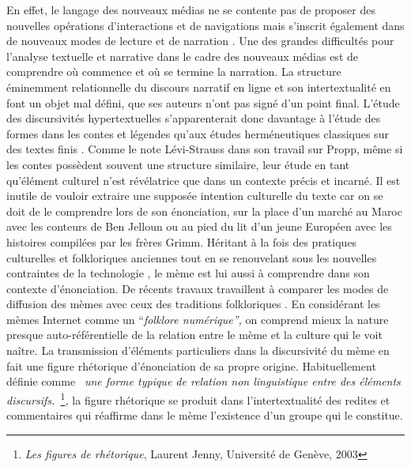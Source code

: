 En effet, le langage des nouveaux médias ne se contente pas de proposer des nouvelles opérations d{\textquoteright}interactions et de navigations mais s{\textquoteright}inscrit également dans de nouveaux modes de lecture et de narration \citep{Manovich2001}. Une des grandes difficultés pour l{\textquoteright}analyse textuelle et narrative dans le cadre des nouveaux médias est de comprendre o\`u commence et o\`u se termine la narration. La structure éminemment relationnelle du discours narratif en ligne et son intertextualité en font un objet mal défini, que ses auteurs n{\textquoteright}ont pas signé d{\textquoteright}un point final. L{\textquoteright}étude des discursivités hypertextuelles s{\textquoteright}apparenterait donc davantage à l{\textquoteright}étude des formes dans les contes et légendes qu{\textquoteright}aux études herméneutiques classiques sur des textes finis \citep{Clement1995}. Comme le note Lévi-Strauss dans son travail sur Propp, même si les contes possèdent souvent une structure similaire, leur étude en tant qu{\textquoteright}élément culturel n{\textquoteright}est révélatrice que dans un contexte précis et incarné. Il est inutile de vouloir extraire une supposée intention culturelle du texte car on se doit de le comprendre lors de son énonciation, sur la place d{\textquoteright}un marché au Maroc avec les conteurs de Ben Jelloun ou au pied du lit d{\textquoteright}un jeune Européen avec les histoires compilées par les frères Grimm. Héritant à la fois des pratiques culturelles et folkloriques anciennes tout en se renouvelant sous les nouvelles contraintes de la technologie \citep{Barber2008}, le mème est lui aussi à comprendre dans son contexte d{\textquoteright}énonciation. De récents travaux travaillent à comparer les modes de diffusion des mèmes avec ceux des traditions folkloriques \citep{Seta2014}. En considérant les mèmes Internet comme un {\textquotedblleft}\textit{folklore numérique{\textquotedblright}, }on comprend mieux la nature presque auto-référentielle de la relation entre le mème et la culture qui le voit na\^itre. La transmission d{\textquoteright}éléments particuliers dans la discursivité du mème en fait une figure rhétorique d{\textquoteright}énonciation de sa propre origine. Habituellement définie comme \textit{{\guillemotleft}~une forme typique de relation non linguistique entre des éléments discursifs.~{\guillemotright}}\footnote{ \textit{Les figures de rhétorique}, Laurent Jenny, Université de Genève, 2003}\textit{, }la figure rhétorique se produit dans l{\textquoteright}intertextualité des redites et commentaires qui réaffirme dans le mème l{\textquoteright}existence d{\textquoteright}un groupe qui le constitue.  

